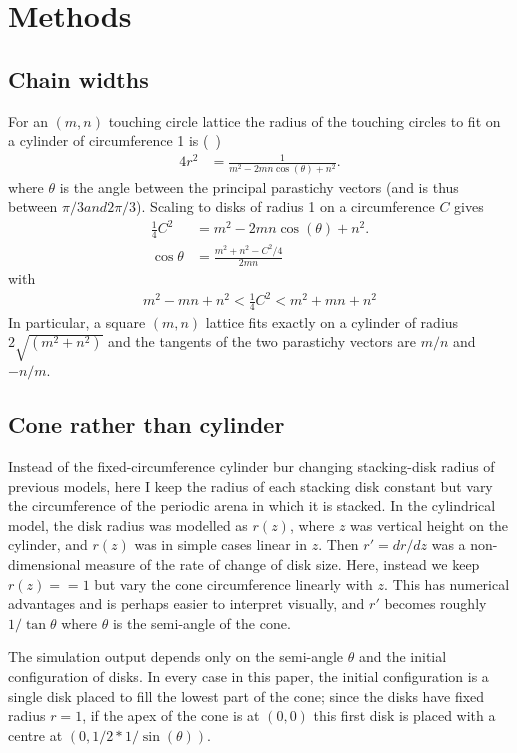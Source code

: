 \documentclass[a4paper,10pt]{amsart}
\begin{document}
 
\section{Methods}
\subsection{Chain widths}
For an $(m,n)$  touching circle lattice the radius of the touching circles to fit on a cylinder of circumference 1 is (~\cite{swintonMathematicalPhyllotaxis2025})
\begin{align}
	4 r^{2}  &=\frac{1}{ m^2-2 m n \cos (\theta )+n^2}.
\end{align}
where $\theta$ is the angle between the principal parastichy vectors (and is thus between $\pi/3 and 2\pi/3$). Scaling to disks of radius 1 on a circumference $C$ gives
\begin{align}
	 \frac{1}{4}C^2   &= m^2-2 m n \cos (\theta )+n^2.
	 \\
	 \cos\theta &= \frac{m^2 + n^2- C^2/4}{2 m n}
\end{align}
with 
\begin{align}
 m^2- m n + n^2  < 	\frac{1}{4}C^2   < m^2 +  m n +n^2
\end{align}
In particular, a square $(m,n)$ lattice fits exactly on a cylinder of radius $2\sqrt{ (m^2+n^2)}$ and the tangents of the two parastichy vectors are $m/n$ and $-n/m$. 


\subsection{Cone rather than cylinder}
Instead of the fixed-circumference cylinder bur  changing stacking-disk radius of previous models, here I keep the radius of each stacking disk constant but vary the circumference of the periodic arena in which it is stacked. In the cylindrical model, the disk radius was modelled as $r(z)$, where $z$ was vertical height on the cylinder, and $r(z)$ was in simple cases linear in $z$. Then $r'=dr/dz$ was a non-dimensional measure of the rate of change of disk size. Here, instead we keep $r(z)==1$ but vary the cone circumference linearly with $z$. This has numerical advantages and is perhaps easier to interpret visually, and $r'$ becomes roughly $1/\tan \theta$ where $\theta$ is the semi-angle of the cone.

The simulation output depends only on the semi-angle $\theta$ and the initial configuration of disks. In every case in this paper, the initial configuration is a single disk placed to fill the lowest part of the cone; since the disks have fixed radius $r=1$, if the apex of the cone is at $(0,0)$ this first disk is placed with a centre at $(0,1/2 * 1/\sin(\theta))$.
 
\end{document}
